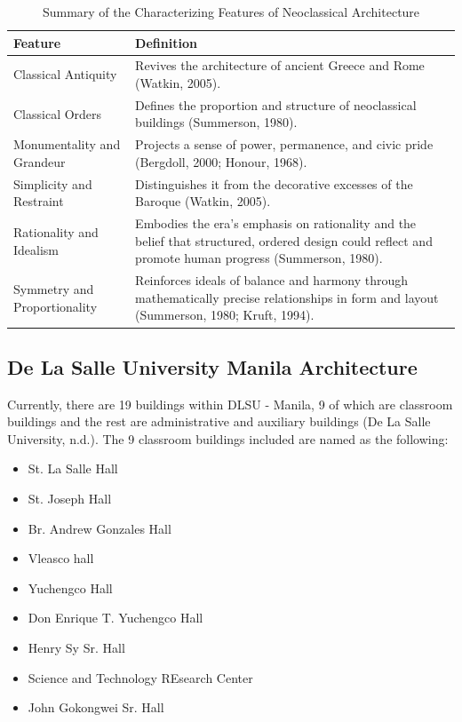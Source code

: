 \documentclass[manuscript,screen,12pt]{article}
\begin{document}
\begin{table}[h!]
\centering
\caption{Summary of the Characterizing Features of Neoclassical Architecture}
\label{tab:neoclassical_features}
\renewcommand{\arraystretch}{1.3} %
\begin{tabular}{>{\raggedright\arraybackslash}p{4cm} >{\raggedright\arraybackslash}p{10cm}}
\toprule
\textbf{Feature} & \textbf{Definition} \\
\midrule
Classical Antiquity & Revives the architecture of ancient Greece and Rome (Watkin, 2005). \\
\addlinespace
Classical Orders & Defines the proportion and structure of neoclassical buildings (Summerson, 1980). \\
\addlinespace
Monumentality and Grandeur & Projects a sense of power, permanence, and civic pride (Bergdoll, 2000; Honour, 1968). \\
\addlinespace
Simplicity and Restraint & Distinguishes it from the decorative excesses of the Baroque (Watkin, 2005). \\
\addlinespace
Rationality and Idealism & Embodies the era’s emphasis on rationality and the belief that structured, ordered design could reflect and promote human progress (Summerson, 1980). \\
\addlinespace
Symmetry and Proportionality & Reinforces ideals of balance and harmony through mathematically precise relationships in form and layout (Summerson, 1980; Kruft, 1994). \\
\bottomrule
\end{tabular}
\end{table}

\subsection{De La Salle University Manila Architecture}
Currently, there are 19 buildings within DLSU - Manila, 9 of which are classroom buildings and the rest are administrative and auxiliary buildings (De La Salle University, n.d.). The 9 classroom buildings included are named as the following:

\begin{itemize}
    \item St. La Salle Hall
    \item St. Joseph Hall
    \item Br. Andrew Gonzales Hall
    \item Vleasco hall
    \item Yuchengco Hall
    \item Don Enrique T. Yuchengco Hall
    \item Henry Sy Sr. Hall
    \item Science and Technology REsearch Center
    \item John Gokongwei Sr. Hall
\end{itemize}
\end{document}
